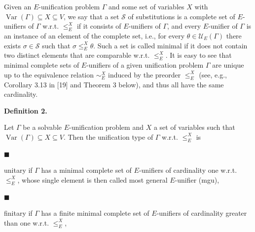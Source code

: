  
 
Given an $E$-unification problem $\Gamma$ and some set of variables $X$ with $\operatorname{Var}(\Gamma)\subseteq X\subseteq V$, we say that a set $\mathcal{S}$ of substitutions is a complete set of $E$-unifiers of $\Gamma$ w.r.t. $\leq_{E}^{X}$ if it consists of $E$-unifiers of $\Gamma$, and every $E$-unifier of $\Gamma$ is an instance of an element of the complete set, i.e., for every $\theta\in\mathcal{U}_{E}(\Gamma)$ there exists $\sigma\in\mathcal{S}$ such that $\sigma\leq_{E}^{X}\theta$. Such a set is called minimal if it does not contain two distinct elements that are comparable w.r.t. $\leq_{E}^{X}$. It is easy to see that minimal complete sets of $E$-unifiers of a given unification problem $\Gamma$ are unique up to the equivalence relation $\sim_{E}^{X}$ induced by the preorder $\leq_{E}^{X}$ (see, e.g., Corollary 3.13 in [19] and Theorem 3 below), and thus all have the same cardinality.\par
 
 
 
\par\medskip\noindent\textbf{Definition 2.}\par
 
 
Let $\Gamma$ be a solvable $E$-unification problem and $X$ a set of variables such that $\operatorname{Var}(\Gamma)\subseteq X\subseteq V$. Then the unification type of $\Gamma$ w.r.t. $\leq_{E}^{X}$ is\par
  
\par\noindent  $\blacksquare$ 
 
unitary if $\Gamma$ has a minimal complete set of $E$-unifiers of cardinality one w.r.t. $\leq_{E}^{X}$, whose single element is then called most general $E$-unifier (mgu),\par
 
 
 
\par\noindent  $\blacksquare$ 
 
finitary if $\Gamma$ has a finite minimal complete set of $E$-unifiers of cardinality greater than one w.r.t. $\leq_{E}^{X}$,\par
 
 
